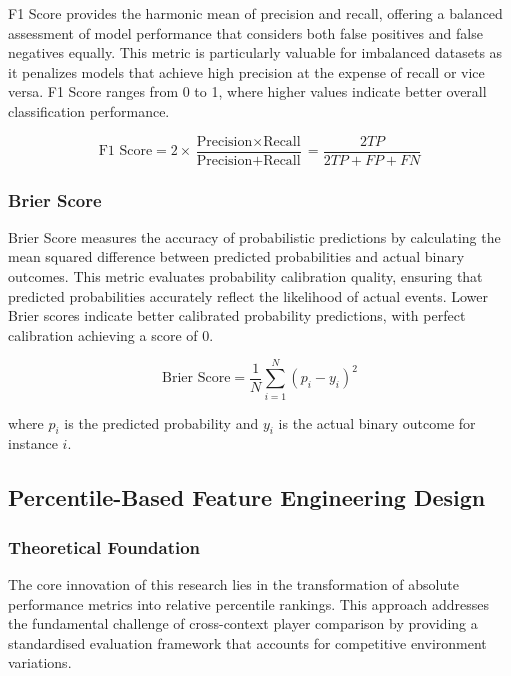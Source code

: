 F1 Score provides the harmonic mean of precision and recall, offering a balanced assessment of model performance that considers both false positives and false negatives equally. This metric is particularly valuable for imbalanced datasets as it penalizes models that achieve high precision at the expense of recall or vice versa. F1 Score ranges from 0 to 1, where higher values indicate better overall classification performance.

\begin{equation}
\text{F1 Score} = 2 \times \frac{\text{Precision} \times \text{Recall}}{\text{Precision} + \text{Recall}} = \frac{2TP}{2TP + FP + FN}
\end{equation}

\subsubsection{Brier Score}

Brier Score measures the accuracy of probabilistic predictions by calculating the mean squared difference between predicted probabilities and actual binary outcomes. This metric evaluates probability calibration quality, ensuring that predicted probabilities accurately reflect the likelihood of actual events. Lower Brier scores indicate better calibrated probability predictions, with perfect calibration achieving a score of 0.

\begin{equation}
\text{Brier Score} = \frac{1}{N} \sum_{i=1}^{N} (p_i - y_i)^2
\end{equation}

where $p_i$ is the predicted probability and $y_i$ is the actual binary outcome for instance $i$.

\subsection{Percentile-Based Feature Engineering Design}

\subsubsection{Theoretical Foundation}

The core innovation of this research lies in the transformation of absolute performance metrics into relative percentile rankings. This approach addresses the fundamental challenge of cross-context player comparison by providing a standardised evaluation framework that accounts for competitive environment variations.


